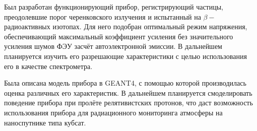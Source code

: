 \documentclass[12pt,a4paper]{report} %
\begin{document}
Был разработан функционирующий прибор, регистрирующий частицы, преодолевшие порог черенковского излучения и испытанный на $\beta-$радиоактивных изотопах. Для него подобран оптимальный режим напряжения, обеспечивающий максимальный коэффициент усиления без значительного усиления шумов ФЭУ засчёт автоэлектронной эмиссии. В дальнейшем планируется изучить его разрешающие характеристики с целью использования его в качестве спектрометра.

Была описана модель прибора в GEANT4, с помощью которой производилась оценка различных его характеристик. В дальнейшем планируется смоделировать поведение прибора при пролёте релятивистских протонов, что даст возможность использования прибора для радиационного мониторинга атмосферы на наноспутнике типа кубсат.

\end{document}

